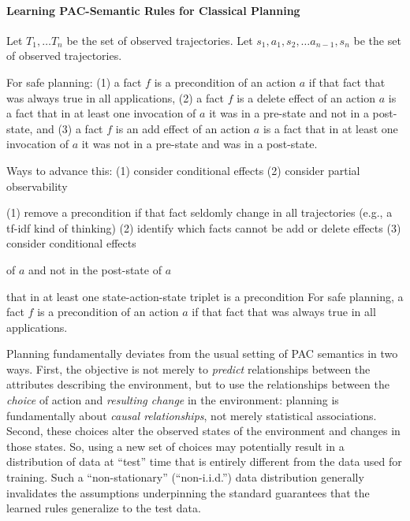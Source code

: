 \documentclass[12pt]{article}
\begin{document}
\paragraph{Learning PAC-Semantic Rules for Classical Planning}

Let $T_1,\ldots T_n$ be the set of observed trajectories. 
Let $s_1,a_1,s_2,\ldots a_{n-1}, s_n$ be the set of observed trajectories.

For safe planning:
(1) a fact $f$ is a precondition of an action $a$ if that fact that was always true in all applications, 
(2) a fact $f$ is a delete effect of an action $a$ is a fact 
that in at least one invocation of $a$ it was in a pre-state and not in a post-state, and 
(3) a fact $f$ is an add effect of an action $a$ is a fact 
that in at least one invocation of $a$ it was not in a pre-state and was in a post-state. 

Ways to advance this:
(1) consider conditional effects
(2) consider partial observability

(1) remove a precondition if that fact seldomly change in all trajectories (e.g., a tf-idf kind of thinking)
(2) identify which facts cannot be add or delete effects
(3) consider conditional effects



of $a$ and not in the post-state of $a$

that in at least one state-action-state triplet is a precondition
For safe planning, a fact $f$ is a precondition of an action $a$ if that fact that was always true in all applications.


Planning fundamentally deviates from the usual setting of PAC semantics in two ways. First, the objective is not merely to {\em predict} relationships between the attributes describing the environment, but to use the relationships between the {\em choice} of action and {\em resulting change} in the environment: planning is fundamentally about {\em causal relationships}, not merely statistical associations. Second, these choices alter the observed states of the environment and changes in those states. So, using a new set of choices may potentially result in a distribution of data at ``test'' time that is entirely different from the data used for training. Such a ``non-stationary'' (``non-i.i.d.'') data distribution generally invalidates the assumptions underpinning the standard guarantees that the learned rules generalize to the test data.
\end{document}
